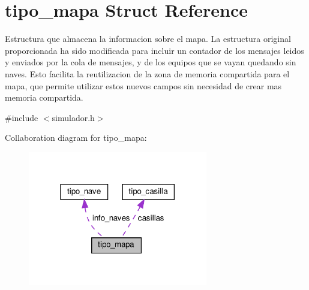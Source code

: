 \hypertarget{structtipo__mapa}{}\section{tipo\+\_\+mapa Struct Reference}
\label{structtipo__mapa}


Estructura que almacena la informacion sobre el mapa. La estructura original proporcionada ha sido modificada para incluir un contador de los mensajes leidos y enviados por la cola de mensajes, y de los equipos que se vayan quedando sin naves. Esto facilita la reutilizacion de la zona de memoria compartida para el mapa, que permite utilizar estos nuevos campos sin necesidad de crear mas memoria compartida.  




{\ttfamily \#include $<$simulador.\+h$>$}



Collaboration diagram for tipo\+\_\+mapa\+:
\nopagebreak
\begin{figure}[H]
\begin{center}
\leavevmode
\includegraphics[width=222pt]{structtipo__mapa__coll__graph}
\end{center}
\end{figure}
